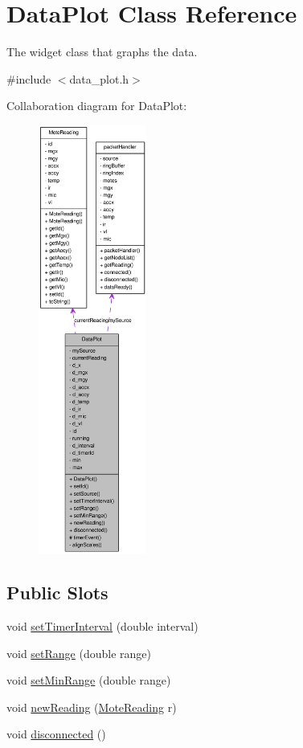 \hypertarget{classDataPlot}{
\section{DataPlot Class Reference}
\label{classDataPlot}
}


The widget class that graphs the data.  




{\ttfamily \#include $<$data\_\-plot.h$>$}



Collaboration diagram for DataPlot:\nopagebreak
\begin{figure}[H]
\begin{center}
\leavevmode
\includegraphics[height=400pt]{classDataPlot__coll__graph}
\end{center}
\end{figure}
\subsection*{Public Slots}
\begin{DoxyCompactItemize}
\item 
void \hyperlink{classDataPlot_a926020e0c49d78d3d5d282848368651e}{setTimerInterval} (double interval)
\item 
void \hyperlink{classDataPlot_a642185fdad89b1b075bc00670242fa0b}{setRange} (double range)
\item 
void \hyperlink{classDataPlot_ad101ac80563ee10322788946d791ea09}{setMinRange} (double range)
\item 
void \hyperlink{classDataPlot_a36fe7e25f67a168d4f7dd2eaa2627003}{newReading} (\hyperlink{classMoteReading}{MoteReading} r)
\item 
void \hyperlink{classDataPlot_a78920a414abdfa954fd34c662f39d09e}{disconnected} ()
\end{DoxyCompactItemize}
